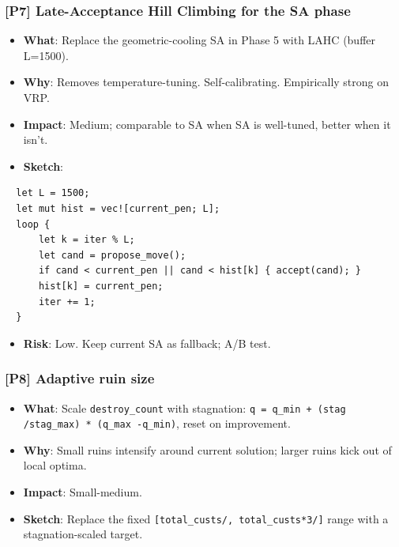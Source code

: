 \documentclass[twocolumn,10pt,letterpaper]{article}
\begin{document}
\subsubsection{[P7] Late-Acceptance Hill Climbing for the SA phase}
\begin{itemize}
\setlength{\itemsep}{0pt}
\setlength{\parskip}{0pt}
  \item \textbf{What}: Replace the geometric-cooling SA in Phase 5 with LAHC (buffer L=1500).
  \item \textbf{Why}: Removes temperature-tuning. Self-calibrating. Empirically strong on VRP.
  \item \textbf{Impact}: Medium; comparable to SA when SA is well-tuned, better when it isn't.
  \item \textbf{Sketch}:
\end{itemize}
\begin{lstlisting}
  let L = 1500;
  let mut hist = vec![current_pen; L];
  loop {
      let k = iter % L;
      let cand = propose_move();
      if cand < current_pen || cand < hist[k] { accept(cand); }
      hist[k] = current_pen;
      iter += 1;
  }
\end{lstlisting}
\begin{itemize}
\setlength{\itemsep}{0pt}
\setlength{\parskip}{0pt}
  \item \textbf{Risk}: Low. Keep current SA as fallback; A/B test.
\end{itemize}

\subsubsection{[P8] Adaptive ruin size}
\begin{itemize}
\setlength{\itemsep}{0pt}
\setlength{\parskip}{0pt}
  \item \textbf{What}: Scale \texttt{destroy\_count} with stagnation: \texttt{q = q\_min + (stag /\allowbreak  stag\_max) * (q\_max -\allowbreak  q\_min)}, reset on improvement.
  \item \textbf{Why}: Small ruins intensify around current solution; larger ruins kick out of local optima.
  \item \textbf{Impact}: Small-medium.
  \item \textbf{Sketch}: Replace the fixed \texttt{[total\_custs/, total\_custs*3/]} range with a stagnation-scaled target.
\end{itemize}
\end{document}

